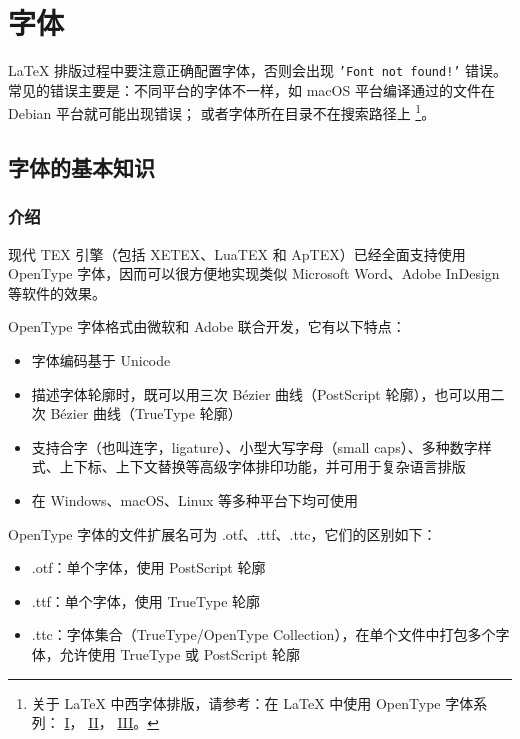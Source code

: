 \chapter{字体}

{\LaTeX} 排版过程中要注意正确配置字体，否则会出现 \texttt{'Font not found!'} 错误。
常见的错误主要是：不同平台的字体不一样，如 macOS 平台编译通过的文件在 Debian 平台就可能出现错误；
或者字体所在目录不在搜索路径上
\footnote{
关于 {\LaTeX} 中西字体排版，请参考：在 {\LaTeX} 中使用 OpenType 字体系列：
\href{https://stone-zeng.github.io/2018-08-08-use-opentype-fonts}{I}，
\href{https://stone-zeng.github.io/2019-07-06-use-opentype-fonts-ii}{II}，
\href{https://stone-zeng.github.io/2020-05-02-use-opentype-fonts-iii/}{III}。
}。

\section{字体的基本知识}

\subsection{介绍}
现代 TEX 引擎（包括 X⁠E⁠TEX、Lua­TEX 和 Ap­TEX）已经全面支持使用 OpenType 字体，因而可以很方便地实现类似 Microsoft Word、Adobe InDesign 等软件的效果。

OpenType 字体格式由微软和 Adobe 联合开发，它有以下特点：

\begin{itemize}
  \item 字体编码基于 Unicode
  \item 描述字体轮廓时，既可以用三次 Bézier 曲线（PostScript 轮廓），也可以用二次 Bézier 曲线（TrueType 轮廓）
  \item 支持合字（也叫连字，ligature）、小型大写字母（small caps）、多种数字样式、上下标、上下文替换等高级字体排印功能，并可用于复杂语言排版
  \item 在 Windows、macOS、Linux 等多种平台下均可使用
\end{itemize}

OpenType 字体的文件扩展名可为 .otf、.ttf、.ttc，它们的区别如下：

\begin{itemize}
  \item .otf：单个字体，使用 PostScript 轮廓
  \item .ttf：单个字体，使用 TrueType 轮廓
  \item .ttc：字体集合（TrueType/OpenType Collection），在单个文件中打包多个字体，允许使用 TrueType 或 PostScript 轮廓
\end{itemize}

